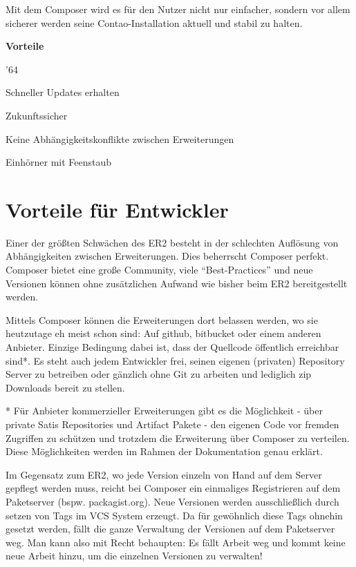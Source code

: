 \documentclass[
paper=a4,
draft=false,%
fontsize=10pt%
]{scrartcl}
\begin{document}
Mit dem Composer wird es für den Nutzer nicht nur einfacher, sondern vor allem sicherer werden seine Contao-Installation aktuell und stabil zu halten.

\textbf{Vorteile}
\begin{dinglist}{'64}
\item Schneller Updates erhalten
\item Zukunftssicher
\item Keine Abhängigkeitskonflikte zwischen Erweiterungen
\item Einhörner mit Feenstaub
\end{dinglist}

\newpage

%
%

\section{Vorteile für Entwickler}
\label{sec:pros-for-developers}

Einer der größten Schwächen des ER2 besteht in der schlechten Auflösung von Abhängigkeiten zwischen Erweiterungen. Dies beherrscht Composer perfekt. Composer bietet eine große Community, viele “Best-Practices” und neue Versionen können ohne zusätzlichen Aufwand wie bisher beim ER2 bereitgestellt werden.

Mittels Composer können die Erweiterungen dort belassen werden, wo sie heutzutage eh meist schon sind: Auf github, bitbucket oder einem anderen Anbieter. Einzige Bedingung dabei ist, dass der Quellcode öffentlich erreichbar sind*. Es steht auch jedem Entwickler frei, seinen eigenen (privaten) Repository Server zu betreiben oder gänzlich ohne Git zu arbeiten und lediglich zip Downloads bereit zu stellen.

\begin{info}
* Für Anbieter kommerzieller Erweiterungen gibt es die Möglichkeit - über private Satis Repositories und Artifact Pakete - den eigenen Code vor fremden Zugriffen zu schützen und trotzdem die Erweiterung über Composer zu verteilen. Diese Möglichkeiten werden im Rahmen der Dokumentation genau erklärt.
\end{info}

Im Gegensatz zum ER2, wo jede Version einzeln von Hand auf dem Server gepflegt werden muss, reicht bei Composer ein einmaliges Registrieren auf dem Paketserver (bspw. packagist.org). Neue Versionen werden ausschließlich durch setzen von Tags im VCS System erzeugt. Da für gewöhnlich diese Tags ohnehin gesetzt werden, fällt die ganze Verwaltung der Versionen auf dem Paketserver weg. Man kann also mit Recht behaupten: Es fällt Arbeit weg und kommt keine neue Arbeit hinzu, um die einzelnen Versionen zu verwalten!
\end{document}
